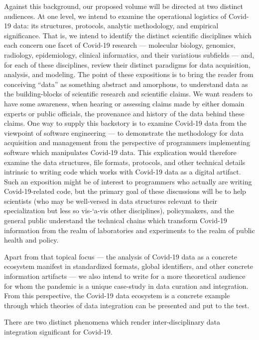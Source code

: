 \documentclass{statsoc}
\newcommand{\textscc}[1]{{\color{orr!35!black}{{%
						\fontfamily{Cabin-TLF}\fontseries{b}\selectfont{\textsc{\scriptsize{#1}}}}}}}
\newcommand{\AcronymText}[1]{{\textscc{#1}}}
\newcommand{\q}[1]{{\fontfamily{qcr}\selectfont ``}#1{\fontfamily{qcr}\selectfont ''}}
\newcommand{\API}{\resizebox{!}{7pt}{\AcronymText{API}}}
\newcommand{\visavis}{vis-`a-vis}
\begin{document}
Against this background, our proposed volume 
will be directed at two distinct audiences.  
At one level, we intend to examine the 
operational logistics of Covid-19 data: its 
structures, protocols, analytic methodology, 
and empirical significance.  That is, we 
intend to identify the distinct scientific 
disciplines which each concern one facet 
of Covid-19 research --- molecular biology, 
genomics, radiology, epidemiology, clinical 
informatics, and their variatious subfields 
--- and, for each of these disciplines, 
review their distinct paradigms for 
data acquisition, analysis, and modeling.  
The point of these expositions is to bring 
the reader from conceiving \q{data} as something 
abstract and amorphous, to understand 
data as the building-blocks of scientific 
research and scientific claims.  We 
want readers to have some awareness, when 
hearing or assessing claims made by either 
domain experts or public officials, the 
provenance and history of the data behind these 
claims.  One way to supply this backstory 
is to examine Covid-19 data from the viewpoint 
of software engineering --- to demonstrate 
the methodology for data acquisition and 
management from the perspective of programmers 
implementing software which manipulates Covid-19 data.  
This explication would therefore examine the 
data structures, file formats, \API{} protocols, 
and other technical details intrinsic to writing 
code which works with Covid-19 data as a 
digital artifact.  Such an exposition might be 
of interest to programmers who actually are 
writing Covid-19-related code, but the primary 
goal of these discussions will be to help 
scientists (who may be well-versed in data 
structures relevant to their specialization 
but less so \visavis{} other disciplines), 
policymakers, and the general public understand 
the technical chains which transform 
Covid-19 information from the realm of 
laboratories and experiments to the realm of 
public health and policy.

Apart from that topical focus --- the analysis 
of Covid-19 data as a concrete ecosystem 
manifest in standardized formats, global 
identifiers, and other concrete information 
artifacts --- we also intend to write for a 
more theoretical audience for whom the 
pandemic is a unique case-study in data 
curation and integration.  From this perspective, 
the Covid-19 data ecosystem is a concrete example 
through which theories of data integration can 
be presented and put to the test.

There are two distinct phenomena which render 
inter-disciplinary data integration significant for 
Covid-19.   
   
\end{document}
